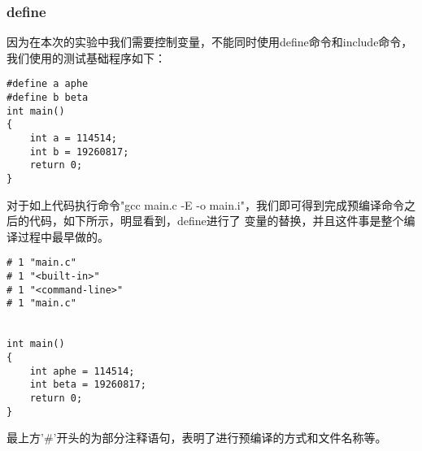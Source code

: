 \documentclass[UTF8]{ctexart}
\begin{document}
\subsubsection{define}
因为在本次的实验中我们需要控制变量，不能同时使用define命令和include命令，我们使用的测试基础程序如下：

\begin{lstlisting}
#define a aphe
#define b beta
int main()
{
    int a = 114514;
    int b = 19260817;
    return 0;
}
\end{lstlisting}
对于如上代码执行命令"gcc  main.c -E -o main.i"，我们即可得到完成预编译命令之后的代码，如下所示，明显看到，define进行了
变量的替换，并且这件事是整个编译过程中最早做的。
\begin{lstlisting}
# 1 "main.c"
# 1 "<built-in>"
# 1 "<command-line>"
# 1 "main.c"


int main()
{
    int aphe = 114514;
    int beta = 19260817;
    return 0;
}
\end{lstlisting}
最上方'\#'开头的为部分注释语句，表明了进行预编译的方式和文件名称等。
\end{document}
